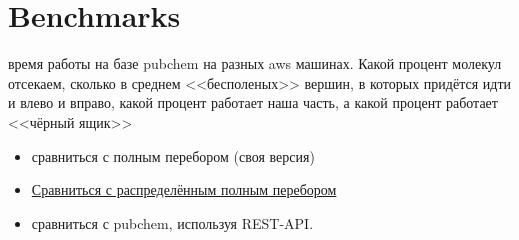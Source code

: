 \section{Benchmarks}

{\color{red} время работы на базе pubchem на разных aws машинах. Какой процент молекул отсекаем, сколько в среднем <<бесполеных>> вершин, в которых придётся идти и влево и вправо, какой процент работает наша часть, а какой процент работает <<чёрный ящик>>}

\begin{itemize}
  \color{red}
  \item сравниться с полным перебором (своя версия) 
  \item \href{https://onlinelibrary.wiley.com/doi/abs/10.1002/minf.201800082}{Сравниться с распределённым полным перебором}
  \item сравниться с pubchem, используя REST-API. 
\end{itemize}




